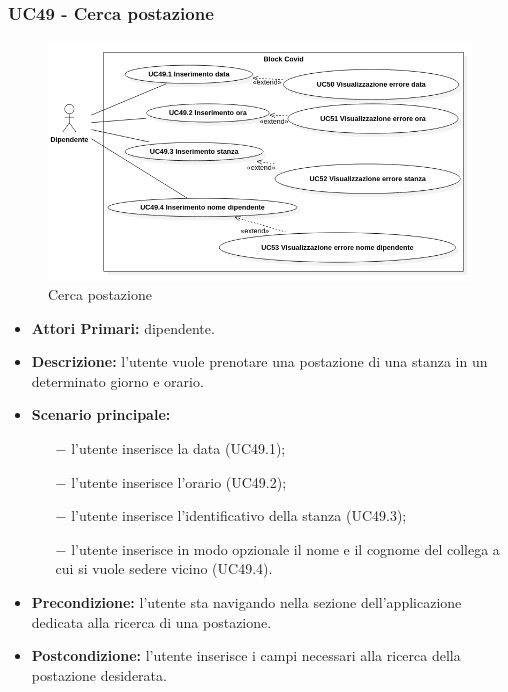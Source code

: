 \subsubsection{ UC49 - Cerca postazione}
\begin{figure}[H]
	\centering
	\includegraphics[width=18cm]{res/images/UC49-50-51-52-53.png}
	\caption{Cerca postazione}
	\label{fig:Cerca postazione}
\end{figure}
\begin{itemize}
	\item\textbf{Attori Primari:} dipendente.
	\item\textbf{Descrizione:} l’utente vuole prenotare una postazione di una stanza in un determinato giorno e orario.
	\item\textbf{Scenario principale:} 
	\begin{itemize}
		\item[$-$] l’utente inserisce la data (UC49.1);
		\item[$-$] l’utente inserisce l'orario (UC49.2);
		\item[$-$] l’utente inserisce l'identificativo della stanza (UC49.3);
		\item[$-$] l’utente inserisce in modo opzionale il nome e il cognome del collega a cui si vuole sedere vicino (UC49.4).
	\end{itemize}
	\item\textbf{Precondizione:} l’utente sta navigando nella sezione dell'applicazione dedicata alla ricerca di una postazione.
	\item\textbf{Postcondizione:} l’utente inserisce i campi necessari alla ricerca della postazione desiderata.
\end{itemize}
